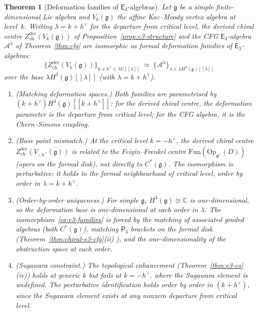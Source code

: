 \documentclass[11pt,reqno]{amsart}
\newtheorem{theorem}{Theorem}[section]
\theoremstyle{definition}
\theoremstyle{remark}
\newcommand{\cA}{\mathcal{A}}
\newcommand{\Ethree}{\mathsf{E}_{3}}
\newcommand{\Pthree}{\mathsf{P}_{3}}
\newcommand{\fg}{\mathfrak{g}}
\newcommand{\CC}{\mathbb{C}}
\numberwithin{equation}{section}
\begin{document}
\begin{theorem}[Deformation families of $\Ethree$-algebras]
\label{thm:e3-identification}
Let $\fg$ be a simple finite-dimensional Lie algebra and
$V_k(\fg)$ the affine Kac--Moody vertex algebra at
level~$k$.
Writing $\lambda = k + h^\vee$ for the departure from
critical level, the derived chiral centre
$Z^{\mathrm{der}}_{\mathrm{ch}}(V_k(\fg))$ of
Proposition~\textup{\ref{prop:e3-structure}} and the
CFG $\Ethree$-algebra $\cA^\lambda$ of
Theorem~\textup{\ref{thm:cfg}} are isomorphic as formal
deformation families of $\Ethree$-algebras:
\begin{equation}\label{eq:e3-families}
  \{Z^{\mathrm{der}}_{\mathrm{ch}}(V_k(\fg))
  \}_{k + h^\vee \in \lambda\CC[[\lambda]]}
  \;\simeq\; \{\cA^\lambda\}_{\lambda
  \in \lambda H^3(\fg)[[\lambda]]}
\end{equation}
over the base $\lambda H^3(\fg)[[\lambda]]$
\textup{(}with $\lambda = k + h^\vee$\textup{)}.
\begin{enumerate}[label=\textup{(\roman*)}]
\item \textup{(Matching deformation spaces.)}
  Both families are parametrised by
  $(k+h^\vee) H^3(\fg)[[k+h^\vee]]$:
  for the derived chiral centre, the deformation
  parameter is the departure from critical level;
  for the CFG algebra, it is the Chern--Simons coupling.
\item \textup{(Base point mismatch.)}
  At the critical level $k = -h^\vee$, the derived
  chiral centre $Z^{\mathrm{der}}_{\mathrm{ch}}
  (V_{-h^\vee}(\fg))$ is related to the
  Feigin--Frenkel centre
  $\mathrm{Fun}(\mathrm{Op}_{\fg^\vee}(D))$
  \textup{(}opers on the formal disk\textup{)}, not
  directly to $C^*(\fg)$. The isomorphism is
  perturbative: it holds in the formal neighbourhood
  of critical level, order by order in
  $\lambda = k + h^\vee$.
\item \textup{(Order-by-order uniqueness.)}
  For simple $\fg$, $H^3(\fg) \cong \CC$ is
  one-dimensional, so the deformation base is
  one-dimensional at each order in $\lambda$. The
  isomorphism~\eqref{eq:e3-families} is forced by
  the matching of associated graded algebras
  \textup{(}both $C^*(\fg)$\textup{)},
  matching $\Pthree$ brackets on the formal disk
  \textup{(}Theorem~\textup{\ref{thm:chiral-e3-cfg}(ii)}%
  \textup{)}, and the one-dimensionality of the
  obstruction space at each order.
\item \textup{(Sugawara constraint.)}
  The topological enhancement
  \textup{(}Theorem~\ref{thm:e3-cs}(iv)\textup{)} holds
  at generic $k$ but fails at $k = -h^\vee$, where
  the Sugawara element is undefined. The perturbative
  identification holds
  order by order in $(k + h^\vee)$, since the Sugawara
  element exists at any nonzero departure from critical
  level.
\end{enumerate}
\end{theorem}
\end{document}
